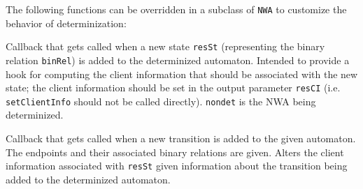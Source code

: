 The following functions can be overridden in a subclass of \texttt{NWA} to
customize the behavior of determinization:
\begin{functionlist}
  Callback that gets called when a new state \texttt{resSt} (representing the
  binary relation \texttt{binRel}) is added to the determinized automaton.
  Intended to provide a hook for computing the client information that should
  be associated with the new state; the client information should be set in
  the output parameter \texttt{resCI} (i.e. \texttt{setClientInfo} should not
  be called directly). \texttt{nondet} is the NWA being determinized.

   \nopagebreak
    Callback that gets called when a new transition is added to the given
    automaton. The endpoints and their associated binary relations are
    given.
    Alters the client information associated with \texttt{resSt} given
    information about the transition being added to the determinized
    automaton.
 \end{functionlist}

